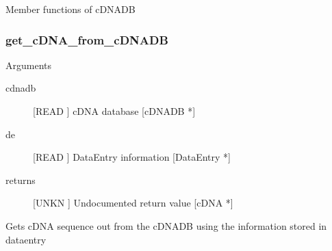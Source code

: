 Member functions of cDNADB

\subsubsection{get_cDNA_from_cDNADB}

Arguments
\begin{description}
\item[cdnadb] [READ ] cDNA database [cDNADB *]
\item[de] [READ ] DataEntry information  [DataEntry *]
\item[returns] [UNKN ] Undocumented return value [cDNA *]
\end{description}
Gets cDNA sequence out from
the cDNADB using the information stored in
dataentry


